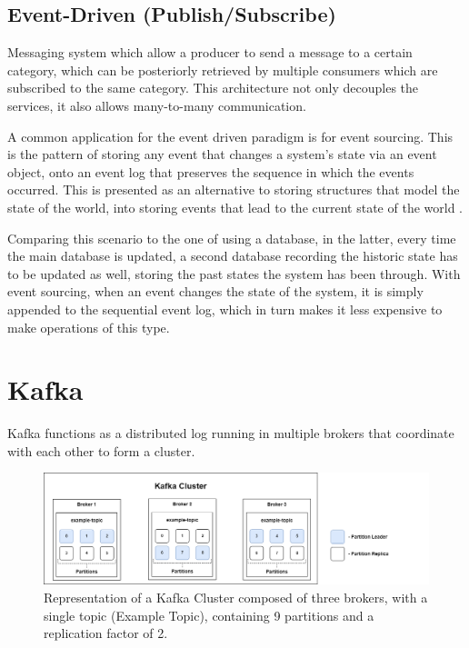 \subsection{Event-Driven (Publish/Subscribe)}

Messaging system which allow a producer to send a message to a certain category,
which can be posteriorly retrieved by multiple consumers which are subscribed to
the same category. This architecture not only decouples the services, it also
allows many-to-many communication.

A common application for the event driven paradigm is for event sourcing. This
is the pattern of storing any event that changes a system's state via an event
object, onto an event log that preserves the sequence in which the events
occurred. This is presented as an alternative to storing structures that model
the state of the world, into storing events that lead to the current state of
the world \cite[Chapter~5]{nadareishvili2016microservice}.

Comparing this scenario to the one of using a database, in the latter, every
time the main database is updated, a second database recording the historic
state has to be updated as well, storing the past states the system has been
through. With event sourcing, when an event changes the state of the system, it
is simply appended to the sequential event log, which in turn makes it less
expensive to make operations of this type.

\section{Kafka}

Kafka functions as a distributed log running in multiple brokers that coordinate
with each other to form a cluster.

\begin{figure}[H] 
    \centering
    \includegraphics[width=\textwidth]{images/infrastructure/Kafka Cluster.png}
    \caption{
        Representation of a Kafka Cluster composed of three brokers, with a
        single topic (Example Topic), containing 9 partitions and a
        replication factor of 2.
    } 
    \label{fig:kafka_cluster} 
\end{figure}

